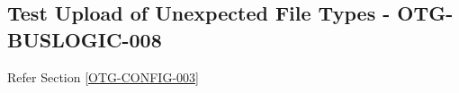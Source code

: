 \subsection{Test Upload of Unexpected File Types - OTG-BUSLOGIC-008}
Refer Section \ref{OTG-CONFIG-003}
\clearpage